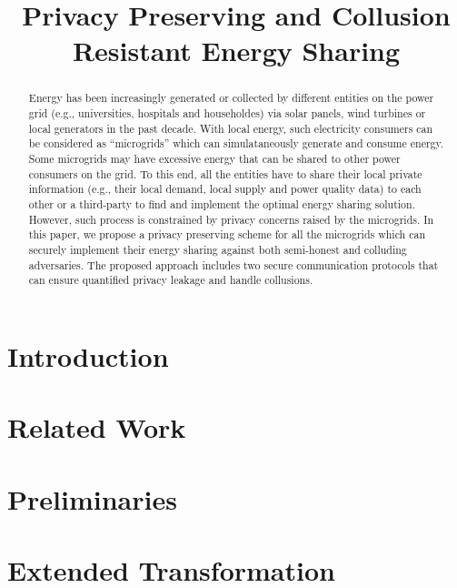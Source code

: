 \documentclass{article}
\title{Privacy Preserving and Collusion Resistant Energy Sharing}
\begin{document}
%
\maketitle
%
\begin{abstract}


Energy has been increasingly generated or collected by different entities on the power grid (e.g., universities, hospitals and householdes) via solar panels, wind turbines or local generators in the past decade. With local energy, such electricity consumers can be considered as ``microgrids'' which can simulataneously generate and consume energy. Some microgrids may have excessive energy that can be shared to other power consumers on the grid. To this end,  all the entities have to share their local private information (e.g., their local demand, local supply and power quality data) to each other or a third-party to find and implement the optimal energy sharing solution. However, such process is constrained by privacy concerns raised by the microgrids. In this paper, we propose a privacy preserving scheme for all the microgrids which can securely implement their energy sharing against both semi-honest and colluding adversaries. The proposed approach includes two secure communication protocols that can ensure quantified privacy leakage and handle collusions.


\end{abstract}
%
%

\section{Introduction}
\label{sec:intro}


\section{Related Work}
\label{sec:related}


\section{Preliminaries}
\label{sec:pre}


\section{Extended Transformation}
\label{sec:ext}

\end{document}
